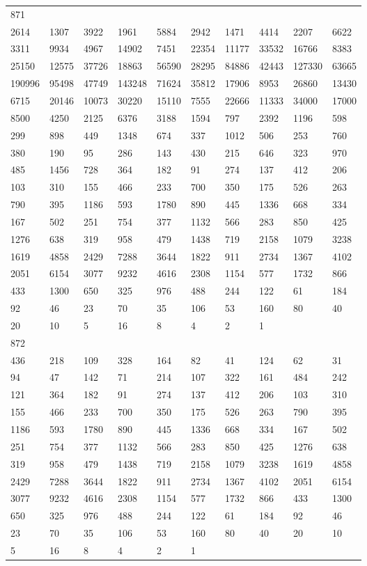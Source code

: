 \begin{longtable}{*{10}{l}}
871&&&&&&&&&\\
2614& 1307& 3922& 1961& 5884& 2942& 1471& 4414& 2207& 6622\\
3311& 9934& 4967& 14902& 7451& 22354& 11177& 33532& 16766& 8383\\
25150& 12575& 37726& 18863& 56590& 28295& 84886& 42443& 127330& 63665\\
190996& 95498& 47749& 143248& 71624& 35812& 17906& 8953& 26860& 13430\\
6715& 20146& 10073& 30220& 15110& 7555& 22666& 11333& 34000& 17000\\
8500& 4250& 2125& 6376& 3188& 1594& 797& 2392& 1196& 598\\
299& 898& 449& 1348& 674& 337& 1012& 506& 253& 760\\
380& 190& 95& 286& 143& 430& 215& 646& 323& 970\\
485& 1456& 728& 364& 182& 91& 274& 137& 412& 206\\
103& 310& 155& 466& 233& 700& 350& 175& 526& 263\\
790& 395& 1186& 593& 1780& 890& 445& 1336& 668& 334\\
167& 502& 251& 754& 377& 1132& 566& 283& 850& 425\\
1276& 638& 319& 958& 479& 1438& 719& 2158& 1079& 3238\\
1619& 4858& 2429& 7288& 3644& 1822& 911& 2734& 1367& 4102\\
2051& 6154& 3077& 9232& 4616& 2308& 1154& 577& 1732& 866\\
433& 1300& 650& 325& 976& 488& 244& 122& 61& 184\\
92& 46& 23& 70& 35& 106& 53& 160& 80& 40\\
20& 10& 5& 16& 8& 4& 2& 1& \\

872&&&&&&&&&\\
436& 218& 109& 328& 164& 82& 41& 124& 62& 31\\
94& 47& 142& 71& 214& 107& 322& 161& 484& 242\\
121& 364& 182& 91& 274& 137& 412& 206& 103& 310\\
155& 466& 233& 700& 350& 175& 526& 263& 790& 395\\
1186& 593& 1780& 890& 445& 1336& 668& 334& 167& 502\\
251& 754& 377& 1132& 566& 283& 850& 425& 1276& 638\\
319& 958& 479& 1438& 719& 2158& 1079& 3238& 1619& 4858\\
2429& 7288& 3644& 1822& 911& 2734& 1367& 4102& 2051& 6154\\
3077& 9232& 4616& 2308& 1154& 577& 1732& 866& 433& 1300\\
650& 325& 976& 488& 244& 122& 61& 184& 92& 46\\
23& 70& 35& 106& 53& 160& 80& 40& 20& 10\\
5& 16& 8& 4& 2& 1& \\


\end{longtable}
